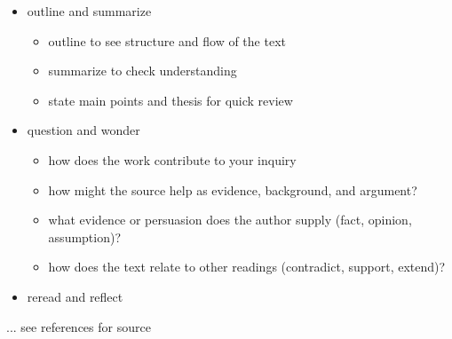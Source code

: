 \begin{frame}
\begin{itemize}\setlength\itemsep{1em}
\item outline and summarize\medskip
\begin{itemize}\setlength\itemsep{1em}
\item outline to see structure and flow of the text
\item summarize to check understanding
\item state main points and thesis for quick review
\end{itemize}
\end{itemize}
\end{frame}
\begin{frame}
\begin{itemize}\setlength\itemsep{1em}
\item question and wonder\medskip
\begin{itemize}\setlength\itemsep{1em}
\item how does the work contribute to your inquiry
\item how might the source help as evidence, background, and argument?
\item what evidence or persuasion does the author supply (fact, opinion, assumption)?
\item how does the text relate to other readings (contradict, support, extend)?
\end{itemize}
\end{itemize}

\end{frame}
\begin{frame}
\begin{itemize}
\item reread and reflect
\end{itemize}\vspace{0.5cm}
... see references for source\nocite{CUBoulder.2018} \nocite{Purugganan2004} \nocite{Keshav2016}
\end{frame}
